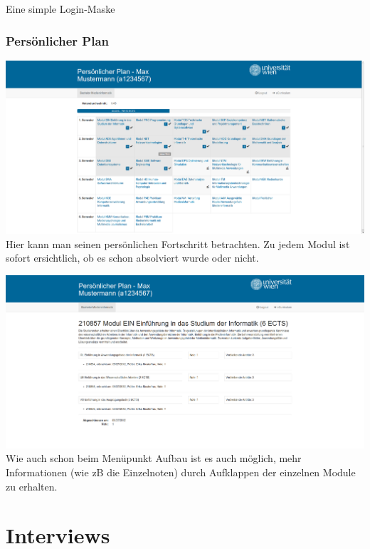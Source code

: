 \documentclass[a4paper,10pt]{scrartcl}
\begin{document}
Eine simple Login-Maske

\subsubsection{Persönlicher Plan}

\includegraphics[scale=0.19]{./hifi_screenshots/hifi_persplan.png}\\

Hier kann man seinen persönlichen Fortschritt betrachten. Zu jedem Modul ist sofort ersichtlich, ob es schon absolviert wurde oder nicht.

\includegraphics[scale=0.19]{./hifi_screenshots/hifi_persplan2.png}\\

Wie auch schon beim Menüpunkt Aufbau ist es auch möglich, mehr Informationen (wie zB die Einzelnoten) durch Aufklappen der einzelnen Module zu erhalten.

\section{Interviews}

\end{document}
